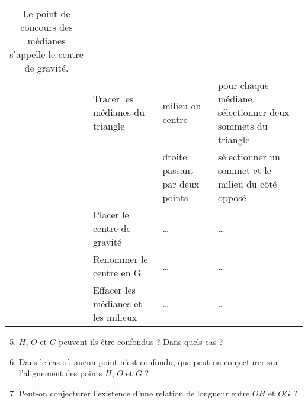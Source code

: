 \begin{tabular}{|cp{5.5cm}|p{4.5cm}|p{5cm}|}
{{         Le point de concours des médianes s'appelle le centre de gravité.}} \\
         & Tracer les médianes du triangle  &  milieu ou centre & pour chaque médiane, sélectionner deux sommets du triangle \\
         & & droite passant par deux points & sélectionner un sommet et le milieu du côté opposé \\
         & Placer le centre de gravité & \dots & \dots \\
         & Renommer le centre en G & \dots & \dots \\
         & Effacer les médianes et les milieux & \dots & \dots \\
         \hline
      \end{tabular}
   \bigskip
   
   \partie[constatations]
      \begin{enumerate}
      \setcounter{enumi}{4}
         \item $H$, $O$ et $G$ peuvent-ils être confondus ? Dans quels cas ? \\ [3mm] 
            \pf \smallskip
         \item Dans le cas où aucun point n'est confondu, que peut-on conjecturer sur l'alignement des points $H$, $O$ et $G$ ? \\ [3mm]
            \pf \smallskip 
          \item Peut-on conjecturer l'existence d'une relation de longueur entre $OH$ et $OG$ ? \\ [3mm]
            \pf
      \end{enumerate} 

